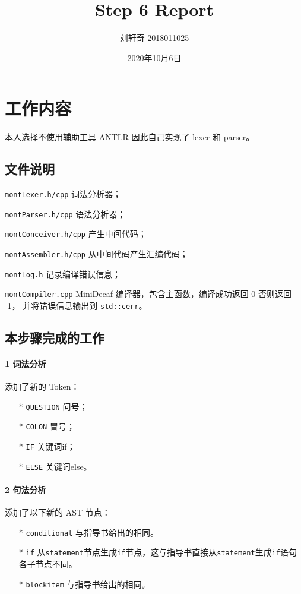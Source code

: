 \documentclass[UTF8]{ctexart}
\title{Step 6 Report}
\author{刘轩奇 2018011025}
\date{2020年10月6日}
\newcommand{\T}[1]{\texttt{{#1}}}
\begin{document}
    \maketitle
    \section{工作内容}
        本人选择不使用辅助工具 ANTLR 因此自己实现了 lexer 和 parser。
        \subsection{文件说明} 
            \T{montLexer.h/cpp} 词法分析器；

            \T{montParser.h/cpp} 语法分析器；

            \T{montConceiver.h/cpp} 产生中间代码；

            \T{montAssembler.h/cpp} 从中间代码产生汇编代码；
            
            \T{montLog.h} 记录编译错误信息；

            \T{montCompiler.cpp} MiniDecaf 编译器，包含主函数，编译成功返回 0 否则返回 -1，
            并将错误信息输出到 \T{std::cerr}。
        
        \subsection{本步骤完成的工作}

            \paragraph{1 词法分析} 添加了新的 Token：
            \begin{itemize}
                \item[*] \T{QUESTION} 问号；
                \item[*] \T{COLON} 冒号；
                \item[*] \T{IF} 关键词if；
                \item[*] \T{ELSE} 关键词else。
            \end{itemize}

            \paragraph{2 句法分析} 添加了以下新的 AST 节点：
            \begin{itemize}
                \item[*] \T{conditional} 与指导书给出的相同。
                \item[*] \T{if} 从\T{statement}节点生成\T{if}节点，这与指导书直接从\T{statement}生成\T{if}语句各子节点不同。
                \item[*] \T{blockitem} 与指导书给出的相同。
            \end{itemize}
\end{document}
